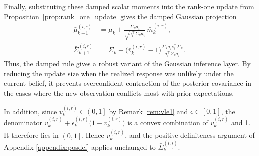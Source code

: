 \documentclass{article}
\begin{document}
Finally, substituting these damped scalar moments into the rank-one update from
Proposition~\ref{prop:rank_one_update} gives the damped Gaussian projection
\begin{align*}
\bar{\mu}_{k+1}^{(i,r)}
&=
\mu_k
+
\frac{\Sigma_k a_i}{\sqrt{a_i^\top\Sigma_k a_i}}\,
\bar{m}_k^{(i,r)},
\label{eq:app_damped_mu}
\\
\bar{\Sigma}_{k+1}^{(i,r)}
&=
\Sigma_k
+
\bigl(\bar{v}_k^{(i,r)}-1\bigr)
\frac{\Sigma_k a_i a_i^\top\Sigma_k}{a_i^\top\Sigma_k a_i}.
\label{eq:app_damped_sigma}
\end{align*}
Thus, the damped rule gives a robust variant of the Gaussian inference layer. By reducing the update size when the realized response was unlikely under the current belief, it prevents overconfident contraction of the posterior covariance in the cases where the new observation conflicts most with prior expectations. 


In addition, since $v_{k}^{(i,r)} \in \left(0,1\right]$ by Remark \ref{rem:vle1} and $\epsilon \in \left[ 0,1 \right]$, the denominator ${v_k^{(i,r)}+\epsilon_k^{(i,r)}\bigl(1-v_k^{(i,r)}\bigr)}$ is a convex combination of $v_{k}^{(i,r)}$ and 1. It therefore lies in $\left(0,1\right]$. Hence $\bar{v_{k}^{(i,r)}}$, and the positive definiteness argument of Appendix \ref{appendix:posdef} applies unchanged to $\bar{\Sigma}_{k+1}^{(i,r)}$.
\end{document}
